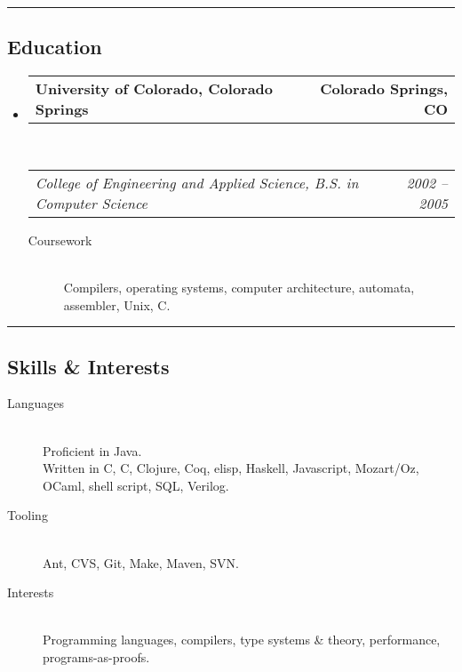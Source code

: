 \documentclass[10pt,letterpaper]{article}
\makeatletter
\newenvironment{indentsection}[1]%
{\begin{list}{}%
	{\setlength{\leftmargin}{#1}}%
	\item[]%
}
{\end{list}}
\newcommand{\headerrow}[2]
{\begin{tabular*}{\linewidth}{l@{\extracolsep{\fill}}r}
	#1 &
	#2 \\
\end{tabular*}}
\newcommand{\CPP}
{C\nolinebreak[4]\hspace{-.05em}\raisebox{.22ex}{\footnotesize\bf ++}}
\makeatother
\begin{document}
\hrule
\vspace{-0.4em}
\subsection*{Education}

\begin{itemize}
	\parskip=0.1em

	\item
	\headerrow
		{\textbf{University of Colorado, Colorado Springs}}
		{\textbf{Colorado Springs, CO}}
	\\
	\headerrow
		{\emph{College of Engineering and Applied Science, B.S. in Computer Science}}
		{\emph{2002 -- 2005}}
	\begin{description}
		\item[Coursework] \hfill \\
			Compilers, operating systems, computer architecture, automata, assembler, Unix, C.
	\end{description}

\end{itemize}


\hrule
\vspace{-0.4em}
\subsection*{Skills \& Interests}

\begin{indentsection}{\parindent}
\begin{description}
	\item[Languages] \hfill \\
	Proficient in Java. \\
	Written in C, \CPP, Clojure, Coq, elisp, Haskell, Javascript, Mozart/Oz, OCaml, shell script, SQL, Verilog.
	\item[Tooling] \hfill \\
	Ant, CVS, Git, Make, Maven, SVN.
	\item[Interests] \hfill \\
	Programming languages, compilers, type systems \& theory, performance, programs-as-proofs.
\end{description}
\end{indentsection}
\end{document}

